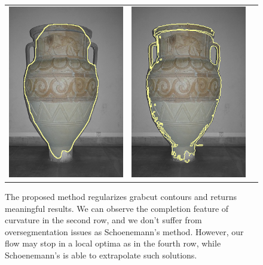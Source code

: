 \documentclass[runningheads]{llncs}
\begin{document}
\begin{figure}
\begin{tabular}{ccc}
		\includegraphics[scale=0.2]{images/segmentation/bc/vase/corrected-seg.png} &					\includegraphics[scale=0.2]{images/segmentation/schoenemann/vase/vase-seg.png}		
	\end{tabular}
	\caption{The proposed method regularizes grabcut contours and returns meaningful results. We can observe the completion feature of curvature in the second row, and we don't suffer from oversegmentation issues as Schoenemann's method. However, our flow may stop in a local optima as in the fourth row, while Schoenemann's is able to extrapolate such solutions.}
	\label{fig:segmentation-results}	
\end{figure}
\end{document}
